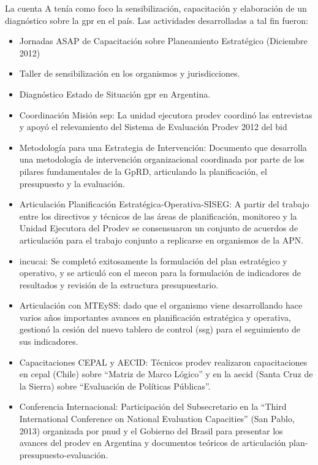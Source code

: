 La cuenta A tenía como foco la sensibilización, capacitación y  elaboración de un diagnóstico sobre la \ac{gpr} en el país. Las actividades desarrolladas a tal fin fueron:
    \begin{itemize}
        \item Jornadas ASAP de Capacitación sobre Planeamiento Estratégico (Diciembre 2012)
        \item Taller de sensibilización en los organismos y jurisdicciones.
        \item Diagnóstico Estado de Situación \ac{gpr} en Argentina. 
        \item Coordinación Misión \ac{sep}: La unidad ejecutora \ac{prodev} coordinó las entrevistas y apoyó el relevamiento del Sistema de Evaluación Prodev 2012 del \ac{bid}
        \item Metodología para una Estrategia de Intervención: Documento que desarrolla una metodología de intervención organizacional coordinada por parte de los pilares fundamentales de la GpRD, articulando la planificación, el presupuesto y la evaluación.
        \item Articulación Planificación Estratégica-Operativa-SISEG: A partir del trabajo entre los directivos y técnicos de las áreas de planificación, monitoreo y la  Unidad Ejecutora del Prodev se consensuaron un conjunto de acuerdos de articulación para el trabajo conjunto a replicarse en organismos de la APN.
        \item \acrshort{incucai}: Se completó exitosamente la formulación del plan estratégico y operativo, y se articuló con el \ac{mecon} para la formulación de indicadores de resultados y revisión de la estructura presupuestario.   
        \item Articulación con MTEySS: dado que el organismo viene desarrollando hace varios años importantes avances en planificación estratégica y operativa, gestionó la cesión del nuevo tablero de control (\ac{ssg}) para el seguimiento de sus indicadores.
        \item Capacitaciones CEPAL y AECID: Técnicos \ac{prodev} realizaron capacitaciones en \ac{cepal} (Chile) sobre “Matriz de Marco Lógico” y en la \ac{aecid} (Santa Cruz de la Sierra) sobre “Evaluación de Políticas Públicas”.
        \item Conferencia Internacional: Participación del Subsecretario en la “Third International Conference on National Evaluation Capacities” (San Pablo, 2013) organizada por \acrshort{pnud} y el Gobierno del Brasil para presentar los avances del \ac{prodev} en Argentina y documentos teóricos de articulación plan-presupuesto-evaluación.

\end{itemize}
